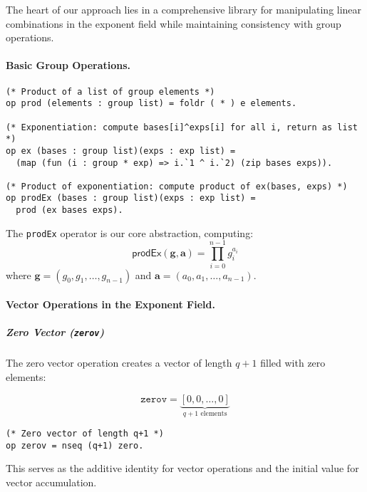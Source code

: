 The heart of our approach lies in a comprehensive library for manipulating linear combinations in the exponent field while maintaining consistency with group operations.

\paragraph{Basic Group Operations.}

\begin{lstlisting}[style=easycrypt, caption=Basic Group Operations, breaklines=true, breakatwhitespace=true, frame=single, keepspaces=true]
(* Product of a list of group elements *)
op prod (elements : group list) = foldr ( * ) e elements.

(* Exponentiation: compute bases[i]^exps[i] for all i, return as list *)
op ex (bases : group list)(exps : exp list) =
  (map (fun (i : group * exp) => i.`1 ^ i.`2) (zip bases exps)).

(* Product of exponentiation: compute product of ex(bases, exps) *)
op prodEx (bases : group list)(exps : exp list) =
  prod (ex bases exps).
\end{lstlisting}

The \texttt{prodEx} operator is our core abstraction, computing:
\[
\mathsf{prodEx}(\mathbf{g}, \mathbf{a}) = \prod_{i=0}^{n-1} g_i^{a_i}
\]
where $\mathbf{g} = (g_0, g_1, \ldots, g_{n-1})$ and $\mathbf{a} = (a_0, a_1, \ldots, a_{n-1})$.

\paragraph{Vector Operations in the Exponent Field.}

\subparagraph{Zero Vector (\texttt{zerov})}

The zero vector operation creates a vector of length $q+1$ filled with zero elements:

\begin{equation}
\texttt{zerov} = \underbrace{[0, 0, \ldots, 0]}_{q+1 \text{ elements}}
\end{equation}

\begin{lstlisting}[style=easycrypt, caption=Zero Vector Definition, breaklines=true, breakatwhitespace=true, frame=single, keepspaces=true]
(* Zero vector of length q+1 *)
op zerov = nseq (q+1) zero.
\end{lstlisting}

This serves as the additive identity for vector operations and the initial value for vector accumulation.

